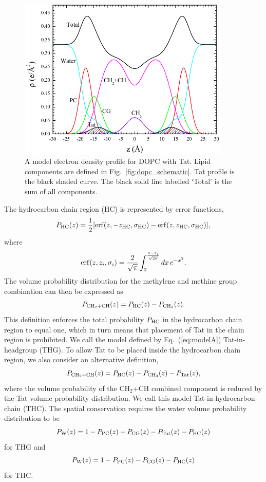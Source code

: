 \begin{figure}[htbp]
  \centering
  \includegraphics[width=0.9\textwidth]{figures/Tat/SDP_Results/EDP/DOPC_Tat_model_EDP}
  \caption{A model electron density profile for DOPC with Tat. Lipid components
  are defined in Fig.~\ref{fig:dopc_schematic}. Tat profile is the black shaded
  curve. The black solid line labelled `Total' is the sum of all components.}
  \label{fig:DOPC_EDP}
\end{figure}

The hydrocarbon chain region (HC) is represented by error functions,
\begin{equation}
  P_\textrm{HC}(z) = \frac{1}{2}\mathopen{}\left[ 
    \mathrm{erf}(z,-z_\textrm{HC},\sigma_\textrm{HC}) - \mathrm{erf}(z,z_\textrm{HC},\sigma_\textrm{HC})
   \right]\mathclose{},
\end{equation}
where
\begin{equation}
  \mathrm{erf}(z,z_i,\sigma_i)=\frac{2}{\sqrt{\pi}}
    \int_0^{\frac{z-z_i}{\sqrt{2\sigma}}} \mathop{dx} e^{-x^2}.
\end{equation}
The volume probability distribution for the methylene and methine group
combination can then be expressed as
\begin{equation}
  P_{\textrm{CH}_2+\textrm{CH}}(z) = P_\textrm{HC}(z)-P_{\textrm{CH}_3}(z).
  \label{eq:modelA}
\end{equation}
This definition enforces the total probability $P_\textrm{HC}$ in the hydrocarbon
chain region to equal one, which in turn means that placement of Tat in the  
chain region is prohibited. We call the model defined by Eq.~(\ref{eq:modelA})
Tat-in-headgroup (THG). To allow Tat to be placed inside the hydrocarbon
chain region, we also consider an alternative definition,
\begin{equation}
  P_{\textrm{CH}_2+\textrm{CH}}(z) = P_\textrm{HC}(z)-P_{\textrm{CH}_3}(z) - P_\textrm{Tat}(z),
\end{equation}
where the volume probability of the CH$_2$+CH combined component is reduced by 
the Tat volume probability distribution. We call this model Tat-in-hydrocarbon-chain (THC).
The spatial conservation requires the water volume probability distribution 
to be
\begin{equation}
  P_\textrm{W}(z) = 1-P_\textrm{PC}(z)-P_\textrm{CG}(z)-P_\textrm{Tat}(z)-P_\textrm{HC}(z)
\end{equation}
for THG and
\begin{equation}
  P_\textrm{W}(z) = 1-P_\textrm{PC}(z)-P_\textrm{CG}(z)-P_\textrm{HC}(z)
\end{equation}
for THC. 

